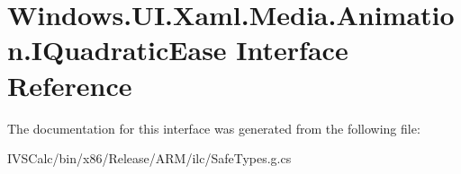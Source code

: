 \hypertarget{interface_windows_1_1_u_i_1_1_xaml_1_1_media_1_1_animation_1_1_i_quadratic_ease}{}\section{Windows.\+U\+I.\+Xaml.\+Media.\+Animation.\+I\+Quadratic\+Ease Interface Reference}
\label{interface_windows_1_1_u_i_1_1_xaml_1_1_media_1_1_animation_1_1_i_quadratic_ease}


The documentation for this interface was generated from the following file\+:\begin{DoxyCompactItemize}
\item 
I\+V\+S\+Calc/bin/x86/\+Release/\+A\+R\+M/ilc/Safe\+Types.\+g.\+cs\end{DoxyCompactItemize}
